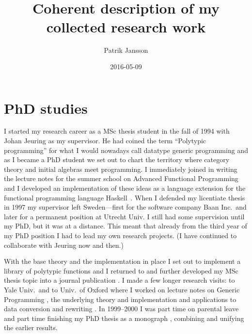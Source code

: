 \documentclass[11pt,twoside,twocolumn]{article}
\title{Coherent description of my collected research work}
\author{Patrik Jansson}
\date{2016-05-09}
\begin{document}
\maketitle

\section{PhD studies}
I started my research career as a MSc thesis student in the fall of
1994 with Johan Jeuring as my supervisor.
%
He had coined the term ``Polytypic programming'' for what I would
nowadays call datatype generic programming and as I became a PhD
student we set out to chart the territory where category theory and
initial algebras meet programming.
%
I immediately joined in writing the lecture notes for the summer
school on Advanced Functional Programming \citep{jeuringjansson-afp}
and I developed an implementation of these ideas as a language
extension for the functional programming language Haskell~\citep{janssonjeuring1997a}.
%
When I defended my licentiate thesis \citep{jansson97a} in 1997 my supervisor
left Sweden---first for the software company Baan Inc.\ and later for a
permanent position at Utrecht Univ.
%
I still had some supervision until my PhD, but it was at a distance.
%
This meant that already from the third year of my PhD position I had
to lead my own research projects.
%
(I have continued to collaborate with Jeuring now and then.)


With the base theory and the implementation in place I set out to
implement a library of polytypic functions
\citep{janssonjeuring-polylib} and I returned to and further developed
my MSc thesis topic into a journal publication
\citep{janssonjeuring-polyunify}.
%
I made a few longer research visits: to Yale Univ.\ and to Univ.\ of Oxford
 where I worked on lecture notes on Generic Programming
\citep{backhouseetal98}, the underlying theory and implementation
\citep{jansson:PolyP2compiler} and applications to data conversion
\citep{janssonjeuringdc} and rewriting
\citep{janssonjeuringWGP00:rewriting}.
%
In 1999--2000 I was part time on parental leave and part time
finishing my PhD thesis as a monograph \citep{jansson-phdthesis}, combining
and unifying the earlier results.
\end{document}
